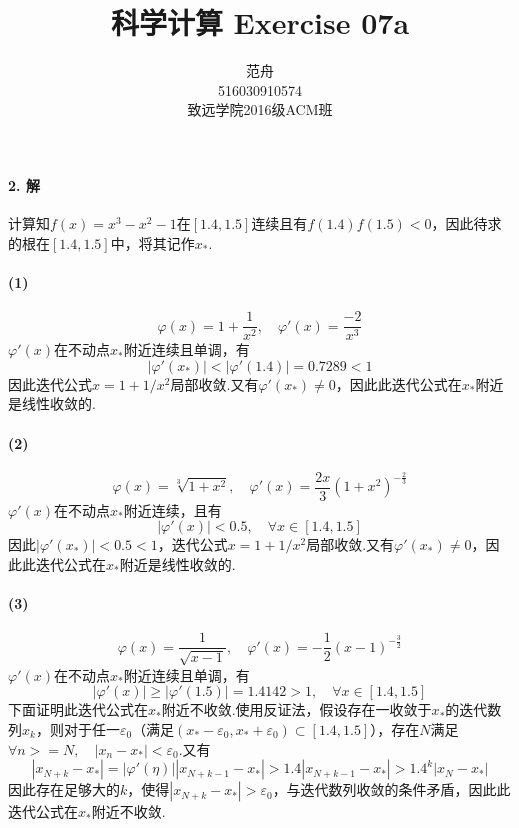 

\title{科学计算 Exercise 07a}
\author{范舟\\516030910574\\致远学院2016级ACM班}
\date{}


\maketitle

\paragraph{2. 解}

计算知$f(x) = x^3 - x^2 - 1$在$[1.4, 1.5]$连续且有$f(1.4) f(1.5) < 0$，因此待求的根在$[1.4, 1.5]$中，将其记作$x_*$.

\paragraph{(1)} 
\[\varphi(x) = 1 + \frac{1}{x^2}, \quad \varphi'(x) = \frac{-2}{x^3}\]
$\varphi'(x)$在不动点$x_*$附近连续且单调，有
\[|\varphi'(x_*)| < |\varphi'(1.4)| = 0.7289 < 1\]
因此迭代公式$x = 1 + 1 / x^2$局部收敛.又有$\varphi'(x_*) \ne 0$，因此此迭代公式在$x_*$附近是线性收敛的.

\paragraph{(2)} 
\[\varphi(x) = \sqrt[3]{1 + x^2}, \quad \varphi'(x) = \frac{2x}{3} (1 + x^2)^{-\frac{2}{3}}\]
$\varphi'(x)$在不动点$x_*$附近连续，且有
\[|\varphi'(x)| < 0.5, \quad \forall x \in [1.4, 1.5]\]
因此$|\varphi'(x_*)| < 0.5 < 1$，迭代公式$x = 1 + 1 / x^2$局部收敛.又有$\varphi'(x_*) \ne 0$，因此此迭代公式在$x_*$附近是线性收敛的.

\paragraph{(3)} 
\[\varphi(x) = \frac{1}{\sqrt{x - 1}}, \quad \varphi'(x) = -\frac{1}{2} (x - 1)^{-\frac{3}{2}}\]
$\varphi'(x)$在不动点$x_*$附近连续且单调，有
\[|\varphi'(x)| \ge |\varphi'(1.5)| = 1.4142 > 1, \quad \forall x \in [1.4, 1.5]\]
下面证明此迭代公式在$x_*$附近不收敛.使用反证法，假设存在一收敛于$x_*$的迭代数列${x_k}$，则对于任一$\varepsilon_0$（满足$(x_* - \varepsilon_0, x_* + \varepsilon_0) \subset [1.4, 1.5]$），存在$N$满足$\forall n >= N, \quad |x_n - x_*| < \varepsilon_0$.又有
\[|x_{N + k} - x_*| = |\varphi'(\eta)||x_{N + k - 1} - x_*| > 1.4 |x_{N + k - 1} - x_*| > 1.4^k |x_N - x_*|\]
因此存在足够大的$k$，使得$|x_{N + k} - x_*| > \varepsilon_0$，与迭代数列收敛的条件矛盾，因此此迭代公式在$x_*$附近不收敛.

